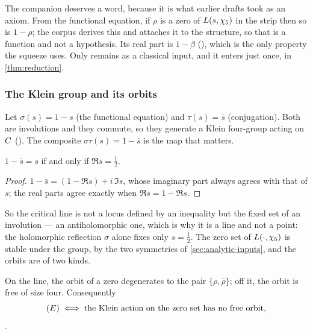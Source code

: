 The companion deserves a word, because it is what earlier drafts took as an
axiom.  From the functional equation, if $\rho$ is a zero of $L(s,\chi_5)$ in the
strip then so is $1-\rho$; the corpus derives this and attaches it to the
structure, so that  is a function and not a
hypothesis.  Its real part is $1-\beta$
(), which is the only property the squeeze
uses.  Only  remains as a classical input, and it enters
just once, in \cref{thm:reduction}.

\subsubsection{The Klein group and its orbits}\label{ssec:klein}

Let $\sigma(s)=1-s$ (the functional equation) and $\tau(s)=\bar s$ (conjugation).
Both are involutions and they commute, so they generate a Klein four-group acting
on $C$ ().  The composite
$\sigma\tau(s)=1-\bar s$ is the map that matters.

\begin{proposition}\label{prop:stau}
$1-\bar s=s$ if and only if $\Re s=\tfrac12$.
%
\end{proposition}
\begin{proof}
$1-\bar s=(1-\Re s)+i\,\Im s$, whose imaginary part always agrees with that of
$s$; the real parts agree exactly when $\Re s=1-\Re s$.
\end{proof}

So the critical line is not a locus defined by an inequality but the fixed set of
an involution --- an antiholomorphic one, which is why it is a line and not a
point: the holomorphic reflection $\sigma$ alone fixes only $s=\tfrac12$.  The
zero set of $L(\cdot,\chi_5)$ is stable under the group, by the two symmetries of
\cref{sec:analytic-inputs}, and the orbits are of two kinds.

\begin{proposition}\label{prop:orbits}
On the line, the orbit of a zero degenerates to the pair $\{\rho,\bar\rho\}$; off
it, the orbit is free of size four.  Consequently
\[
  (E)\iff\text{the Klein action on the zero set has no free orbit,}
\]
\leavevmode{}.
\end{proposition}

